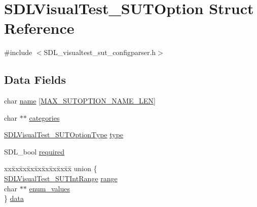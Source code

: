 \hypertarget{struct_s_d_l_visual_test___s_u_t_option}{\section{S\-D\-L\-Visual\-Test\-\_\-\-S\-U\-T\-Option Struct Reference}
\label{struct_s_d_l_visual_test___s_u_t_option}
}


{\ttfamily \#include $<$S\-D\-L\-\_\-visualtest\-\_\-sut\-\_\-configparser.\-h$>$}

\subsection*{Data Fields}
\begin{DoxyCompactItemize}
\item 
char \hyperlink{struct_s_d_l_visual_test___s_u_t_option_ad14ca616d8f7c9b61eff58baaead7f1f}{name} \mbox{[}\hyperlink{_s_d_l__visualtest__sut__configparser_8h_a0a8b0c1f8eee787abf09bf3a840eccc7}{M\-A\-X\-\_\-\-S\-U\-T\-O\-P\-T\-I\-O\-N\-\_\-\-N\-A\-M\-E\-\_\-\-L\-E\-N}\mbox{]}
\item 
char $\ast$$\ast$ \hyperlink{struct_s_d_l_visual_test___s_u_t_option_a6744d43d3ad17d06068dba9ee7b78c83}{categories}
\item 
\hyperlink{_s_d_l__visualtest__sut__configparser_8h_af9893831d9f79360f57e84a67a90293c}{S\-D\-L\-Visual\-Test\-\_\-\-S\-U\-T\-Option\-Type} \hyperlink{struct_s_d_l_visual_test___s_u_t_option_a857b9e5ccfca26034b47a5f3236d822c}{type}
\item 
S\-D\-L\-\_\-bool \hyperlink{struct_s_d_l_visual_test___s_u_t_option_a79305c1b10f7b4defee52e1eefde8fbc}{required}
\item 
\begin{tabbing}
xx\=xx\=xx\=xx\=xx\=xx\=xx\=xx\=xx\=\kill
union \{\\
\>\hyperlink{struct_s_d_l_visual_test___s_u_t_int_range}{SDLVisualTest\_SUTIntRange} \hyperlink{struct_s_d_l_visual_test___s_u_t_option_a2bb1301268866e0e41d035ea0a4914e8}{range}\\
\>char $\ast$$\ast$ \hyperlink{struct_s_d_l_visual_test___s_u_t_option_a596ff3567c4b736561dba1915a2cd38d}{enum\_values}\\
\} \hyperlink{struct_s_d_l_visual_test___s_u_t_option_aa9545bd4acd476f61533d04d53cdffdc}{data}\\

\end{tabbing}\end{DoxyCompactItemize}


